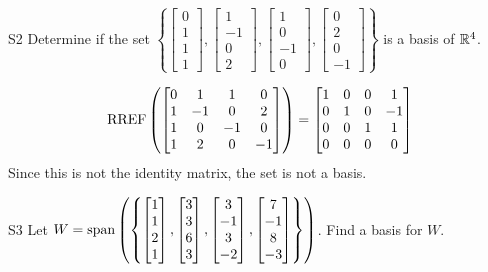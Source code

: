 \documentclass{sbgLAexam}
\begin{document}
\begin{problem}{S2}
Determine if the set $\left\{ \begin{bmatrix} 0 \\ 1 \\ 1 \\ 1 \end{bmatrix}, \begin{bmatrix} 1 \\ -1 \\ 0 \\ 2 \end{bmatrix}, \begin{bmatrix} 1 \\ 0 \\ -1 \\ 0 \end{bmatrix}, \begin{bmatrix}0 \\ 2 \\ 0 \\ -1 \end{bmatrix} \right\}$ is a basis of $\mathbb{R}^4$.
\end{problem}
\begin{solution}
$$\operatorname{RREF}\left(\begin{bmatrix} 0 & 1 & 1 & 0 \\ 1 & -1 & 0 & 2   \\ 1 & 0 & -1 & 0  \\ 1 & 2 & 0 & -1  \end{bmatrix} \right) = \begin{bmatrix} 1 & 0 & 0 & 1  \\ 0 & 1 & 0 & -1  \\ 0 & 0 & 1 & 1  \\ 0 & 0 & 0 & 0 \end{bmatrix} $$
Since this is not the identity matrix, the set is not a basis.
\end{solution}
\begin{extract}\newpage\end{extract}
\begin{problem}{S3}
Let $W = {\rm span} \left( \left\{ \begin{bmatrix} 1 \\ 1 \\ 2 \\ 1 \end{bmatrix}, \begin{bmatrix} 3 \\ 3 \\ 6 \\ 3 \end{bmatrix}, \begin{bmatrix} 3 \\ -1 \\ 3 \\ -2 \end{bmatrix}, \begin{bmatrix} 7 \\ -1 \\ 8 \\ -3 \end{bmatrix} \right\} \right)$.  Find a basis for $W$.
\end{problem}
\end{document}
